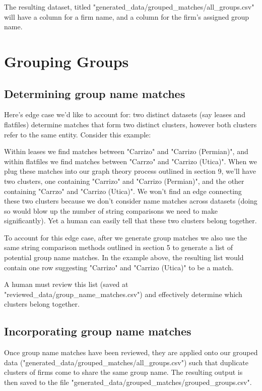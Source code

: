 \documentclass{article}
\begin{document}
The resulting dataset, titled "generated\_data/grouped\_matches/all\_groups.csv" will have a column for a firm name, and a column for the firm's assigned group name. 

\section{Grouping Groups}

\subsection{Determining group name matches}

Here's edge case we'd like to account for: two distinct datasets (say leases and flatfiles) determine matches that form two distinct clusters, however both clusters refer to the same entity. Consider this example:

Within leases we find matches between "Carrizo" and "Carrizo (Permian)", and within flatfiles we find matches between "Carrzo" and "Carrizo (Utica)". When we plug these matches into our graph theory process outlined in section 9, we'll have two clusters, one containing "Carrizo" and "Carrizo (Permian)", and the other containing "Carrzo" and "Carrizo (Utica)". We won't find an edge connecting these two clusters because we don't consider name matches across datasets (doing so would blow up the number of string comparisons we need to make significantly). Yet a human can easily tell that these two clusters belong together.

To account for this edge case, after we generate group matches we also use the same string comparison methods outlined in section 5 to generate a list of potential group name matches. In the example above, the resulting list would contain one row suggesting "Carrizo" and "Carrizo (Utica)" to be a match. 

A human must review this list (saved at "reviewed\_data/group\_name\_matches.csv") and effectively determine which clusters belong together. 

\subsection{Incorporating group name matches}

Once group name matches have been reviewed, they are applied onto our grouped data ("generated\_data/grouped\_matches/all\_groups.csv") such that duplicate clusters of firms come to share the same group name. The resulting output is then saved to the file "generated\_data/grouped\_matches/grouped\_groups.csv". 
\end{document}
